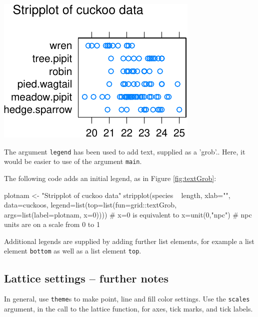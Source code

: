 \documentclass{tufte-book}\usepackage[]{graphicx}\usepackage[]{color}
\newcommand{\txtt}[1]{\texttt{#1}}
\newcommand{\margtt}[1]{{\footnotesize \texttt{#1}}}
\begin{document}
\begin{marginfigure}[-36pt]
\begin{Schunk}


\centerline{\includegraphics[width=\textwidth]{figs/07-strip-grob-1} }

\end{Schunk}
\caption{The argument \margtt{legend} has been used to add text,
  supplied as a 'grob'.\label{fig:textGrob}. Here, it would be
  easier to use of the argument \margtt{main}.}
\end{marginfigure}

The following code adds an initial legend, as in Figure \ref{fig:textGrob}:
\begin{Schunk}
\begin{Sinput}
plotnam <- "Stripplot of cuckoo data"
stripplot(species ~ length, xlab="", data=cuckoos,
  legend=list(top=list(fun=grid::textGrob,
                       args=list(label=plotnam,
                                 x=0))))
# x=0 is equivalent to x=unit(0,"npc")
# npc units are on a scale from 0 to 1
\end{Sinput}
\end{Schunk}
Additional legends are supplied by adding further
  list elements, for example a list element \txtt{bottom} as well as a
  list element \txtt{top}.

\subsection{Lattice settings -- further notes}\label{ss:latticeParam}

In general, use \txtt{theme}s to make point, line and fill color settings.
Use the \txtt{scales} argument, in the call to the lattice function,
for axes, tick marks, and tick labels.
\end{document}
